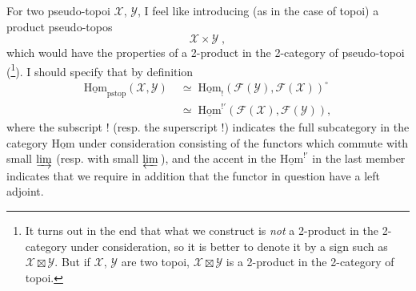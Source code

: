 \documentclass[11pt]{article}
\newcommand{\msp}[1]{\marginpar{\footnotesize [#1]}}
\newcommand{\uHom}{\underline{\mathrm{Hom}}}
\newcommand{\pstop}{\mathrm{pstop}}
\begin{document}
For two pseudo-topoi $\mathcal{X}$, $\mathcal{Y}$, I feel like introducing (as in the case of topoi) a product pseudo-topos
\[
\mathcal{X}\times\mathcal{Y}\;,
\tag*{(4.1.4)}
\]
which would have the properties of a 2-product in the 2-category of pseudo-topoi (\footnote{It turns out in the end that what we construct is \textit{not} a 2-product in the 2-category under consideration, so it is better to denote it by a sign such as $\mathcal{X}\boxtimes\mathcal{Y}$. But if $\mathcal{X}$, $\mathcal{Y}$ are two topoi, $\mathcal{X}\boxtimes\mathcal{Y}$ is a 2-product in the 2-category of topoi.}). I should specify that by definition
\[
\begin{aligned}
\uHom_{\pstop}(\mathcal{X},\mathcal{Y}) \;&\simeq\; \uHom_!(\mathcal{F}(\mathcal{Y}),\mathcal{F}(\mathcal{X}))^\circ\\
&\simeq\; \uHom^{!'}(\mathcal{F}(\mathcal{X}),\mathcal{F}(\mathcal{Y})),
\end{aligned}
\tag*{(4.1.5)}
\]
where the subscript ! (resp. the superscript !) indicates the full subcategory in the category $\uHom$ under consideration consisting of the functors which commute with small $\varinjlim$ (resp. with small
\msp{page 54}
$\varprojlim$\,), and the accent in the $\uHom^{!'}$ in the last member indicates that we require in addition that the functor in question have a left adjoint.
\end{document}
